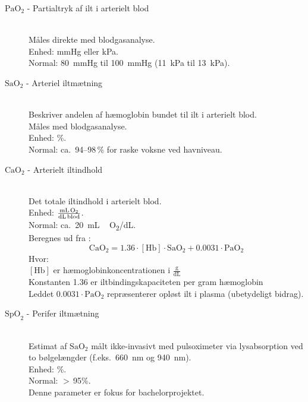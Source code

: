 \begin{description}
    \item[$\text{PaO}_2$ - Partialtryk af ilt i arterielt blod] \hfill
    \\
    Måles direkte med blodgasanalyse. \\
    Enhed: mmHg eller kPa. \\
    Normal: \SI{80}{mmHg} til \SI{100}{mmHg} (\SI{11}{kPa} til \SI{13}{kPa}).

    \item[$\text{SaO}_2$ - Arteriel iltmætning] \hfill
    \\
    Beskriver andelen af hæmoglobin bundet til ilt i arterielt blod. \\
    Måles med blodgasanalyse.  \\
    Enhed: \%.  \\
    Normal: ca.\ 94--98\,\% for raske voksne ved havniveau.

    \item[$\text{CaO}_2$ - Arterielt iltindhold] \hfill
    \\
    Det totale iltindhold i arterielt blod. \\
    Enhed: $\frac{\text{mL\,O}_2}{\text{dL\,blod}}$. \\
    Normal: ca.\ \SI{20}{mL\,O_2/dL}. \\
    Beregnes ud fra \cite[s.~2]{Pltz1998}:
    \begin{equation}
        \text{CaO}_2 = 1.36 \cdot [\text{Hb}] \cdot \text{SaO}_2 + 0.0031 \cdot \text{PaO}_2
        \label{eq:cao2}
    \end{equation}
    Hvor: \\
    $[\text{Hb}]$ er hæmoglobinkoncentrationen i $\frac{\text{g}}{\text{dL}}$ \\
    Konstanten \SI{1.36}{} er iltbindingskapaciteten per gram hæmoglobin \\
    Leddet $0.0031 \cdot \text{PaO}_2$ repræsenterer opløst ilt i plasma (ubetydeligt bidrag).

    \item[$\text{SpO}_2$ - Perifer iltmætning] \hfill
    \\
    Estimat af $\text{SaO}_2$ målt ikke-invasivt med pulsoximeter via lysabsorption
    ved to bølgelængder (f.eks.\ \SI{660}{nm} og \SI{940}{nm}). \\
    Enhed: \%. \\
    Normal: $>$\,95\%. \\
    Denne parameter er fokus for bachelorprojektet.

\end{description}

